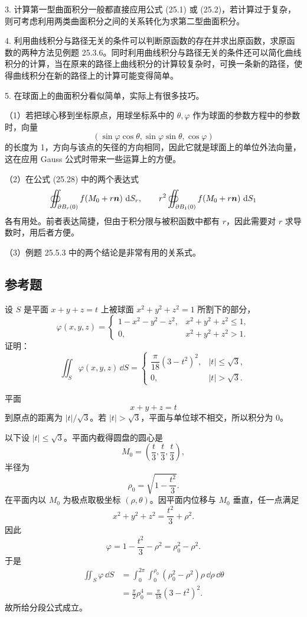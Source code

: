 3. 计算第一型曲面积分一般都直接应用公式 (25.1) 或 (25.2)，若计算过于复杂，则可考虑利用两类曲面积分之间的关系转化为求第二型曲面积分。

4. 利用曲线积分与路径无关的条件可以判断原函数的存在并求出原函数，求原函数的两种方法见例题 25.3.6。同时利用曲线积分与路径无关的条件还可以简化曲线积分的计算，当在原来的路径上曲线积分的计算较复杂时，可换一条新的路径，使得曲线积分在新的路径上的计算可能变得简单。

5. 在球面上的曲面积分看似简单，实际上有很多技巧。

（1）若把球心移到坐标原点，用球坐标系中的 $\theta,\varphi$ 作为球面的参数方程中的参数时，向量
\[
  (\sin\varphi\cos\theta,\sin\varphi\sin\theta,\cos\varphi)
\]
的长度为 1，方向与该点的矢径的方向相同，因此它就是球面上的单位外法向量，这在应用 Gauss 公式时带来一些运算上的方便。

（2）在公式 (25.28) 中的两个表达式
\[
  \oiint_{\partial B_r(0)}f(M_0+r\bm{n})\,\mathop{}\!\mathrm{d} S_r,
  \qquad
  r^2\oiint_{\partial B_1(0)}f(M_0+r\bm{n})\,\mathop{}\!\mathrm{d} S_1
\]
各有用处。前者表达简捷，但由于积分限与被积函数中都有 $r$，因此需要对 $r$ 求导数时，用后者方便。

（3）例题 25.5.3 中的两个结论是非常有用的关系式。

\subsection{参考题}

\begin{xreferenceproblem}[1]
设 $S$ 是平面 $x+y+z=t$ 上被球面 $x^2+y^2+z^2=1$ 所割下的部分，
\[
  \varphi(x,y,z)=
  \begin{cases}
    1-x^2-y^2-z^2,&x^2+y^2+z^2\le1,\\
    0,&x^2+y^2+z^2>1.
  \end{cases}
\]
证明：
\[
  \iint_S\varphi(x,y,z)\,\dd S=
  \begin{cases}
  \dfrac\pi{18}(3-t^2)^2,&|t|\le\sqrt3,\\
  0,&|t|>\sqrt3.
  \end{cases}
\]
\end{xreferenceproblem}
\begin{xsolution}
平面
\[
  x+y+z=t
\]
到原点的距离为 $|t|/\sqrt3$。若 $|t|>\sqrt3$，平面与单位球不相交，所以积分为 $0$。

以下设 $|t|\le\sqrt3$。平面内截得圆盘的圆心是
\[
  M_0=\left(\frac t3,\frac t3,\frac t3\right),
\]
半径为
\[
  \rho_0=\sqrt{1-\frac{t^2}{3}}.
\]
在平面内以 $M_0$ 为极点取极坐标 $(\rho,\theta)$。因平面内位移与 $M_0$ 垂直，任一点满足
\[
  x^2+y^2+z^2=\frac{t^2}{3}+\rho^2.
\]
因此
\[
  \varphi=1-\frac{t^2}{3}-\rho^2=\rho_0^2-\rho^2.
\]
于是
\begin{align*}
\iint_S\varphi\,\dd S
&=\int_0^{2\pi}\int_0^{\rho_0}(\rho_0^2-\rho^2)\rho\,\dd\rho\,\dd\theta\\
&=\frac\pi2\rho_0^4
=\frac\pi{18}(3-t^2)^2.
\end{align*}
故所给分段公式成立。
\end{xsolution}


